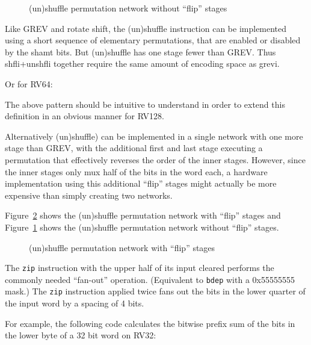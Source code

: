 \begin{figure}[t]
\begin{center}

\end{center}
\caption{(un)shuffle permutation network without ``flip'' stages}
\label{permnet-gzip-noflip}
\end{figure}

Like GREV and rotate shift, the (un)shuffle instruction can be implemented using a short
sequence of elementary permutations, that are enabled or disabled by the shamt
bits. But (un)shuffle has one stage fewer than GREV. Thus shfli+unshfli together require
the same amount of encoding space as grevi.



Or for RV64:



The above pattern should be intuitive to understand in order to extend
this definition in an obvious manner for RV128.

Alternatively (un)shuffle) can be implemented in a single network with one more
stage than GREV, with the additional first and last stage executing a
permutation that effectively reverses the order of the inner stages. However,
since the inner stages only mux half of the bits in the word each, a hardware
implementation using this additional ``flip'' stages might actually be more
expensive than simply creating two networks.



Figure~\ref{permnet-gzip-flip} shows the (un)shuffle permutation network with
``flip'' stages and Figure~\ref{permnet-gzip-noflip} shows the (un)shuffle
permutation network without ``flip'' stages.

\begin{figure}[t]
\begin{center}

\end{center}
\caption{(un)shuffle permutation network with ``flip'' stages}
\label{permnet-gzip-flip}
\end{figure}

The \texttt{zip} instruction with the upper half of its input cleared performs
the commonly needed ``fan-out'' operation. (Equivalent to {\tt bdep} with a
0x55555555 mask.) The \texttt{zip} instruction applied twice fans out the bits
in the lower quarter of the input word by a spacing of 4 bits.

For example, the following code calculates the bitwise prefix sum of the bits
in the lower byte of a 32 bit word on RV32:

